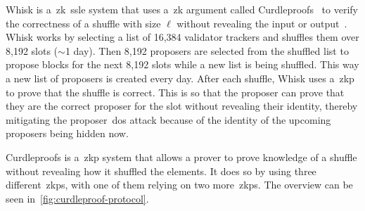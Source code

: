Whisk is a~\gls{zk}~\gls{ssle} system that uses a~\gls{zk} argument called Curdleproofs~\cite{Curdleproofs} to verify the correctness of a shuffle with size $\ell$ without revealing the input or output~\cite{10.1145/3419614.3423258}.
Whisk works by selecting a list of 16,384 validator trackers and shuffles them over 8,192 slots ($\sim$1 day).
Then 8,192 proposers are selected from the shuffled list to propose blocks for the next 8,192 slots while a new list is being shuffled.
This way a new list of proposers is created every day.
After each shuffle, Whisk uses a~\gls{zkp} to prove that the shuffle is correct.
This is so that the proposer can prove that they are the correct proposer for the slot without revealing their identity, thereby mitigating the proposer~\gls{dos} attack because of the identity of the upcoming proposers being hidden now.

Curdleproofs is a~\gls{zkp} system that allows a prover to prove knowledge of a shuffle without revealing how it shuffled the elements.
It does so by using three different~\glspl{zkp}, with one of them relying on two more~\glspl{zkp}.
The overview can be seen in~\autoref{fig:curdleproof-protocol}.

